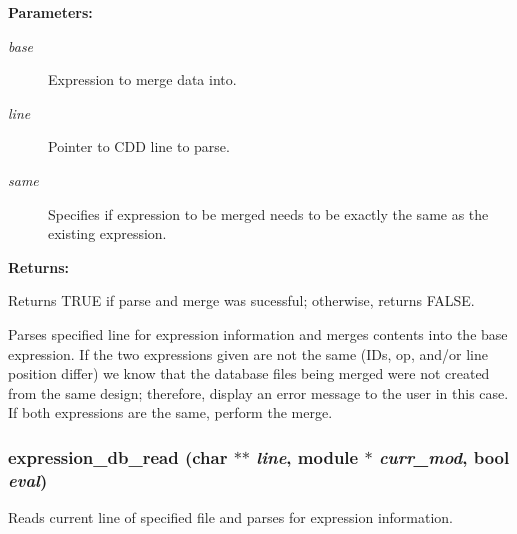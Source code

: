 \begin{Desc}
\item[{\bf Parameters: }]\par
\begin{description}
\item[
{\em base}]Expression to merge data into. \item[
{\em line}]Pointer to CDD line to parse. \item[
{\em same}]Specifies if expression to be merged needs to be exactly the same as the existing expression.

\end{description}
\end{Desc}
\begin{Desc}
\item[{\bf Returns: }]\par
Returns TRUE if parse and merge was sucessful; otherwise, returns FALSE.

\end{Desc}
Parses specified line for expression information and merges contents into the base expression. If the two expressions given are not the same (IDs, op, and/or line position differ) we know that the database files being merged  were not created from the same design; therefore, display an error message  to the user in this case. If both expressions are the same, perform the  merge. 
\subsubsection{ expression\_\-db\_\-read (char $\ast$$\ast$ {\em line}, {\bf module} $\ast$ {\em curr\_\-mod}, {\bf bool} {\em eval})}\label{expr_8h_a6}


Reads current line of specified file and parses for expression information.

